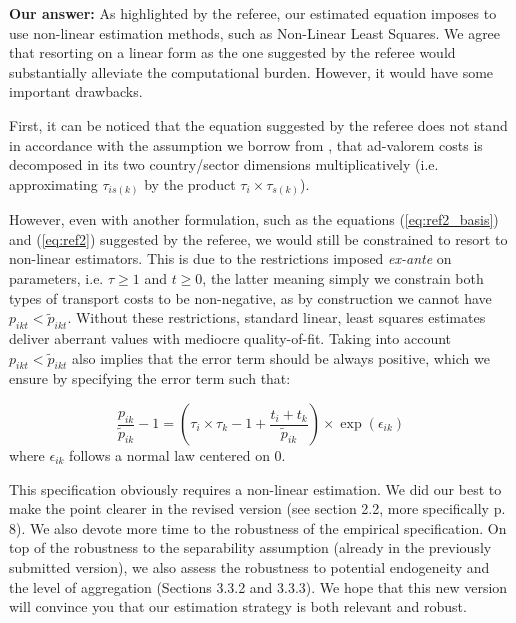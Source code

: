 \documentclass[a4paper,11pt]{article}
\begin{document}
\textbf{Our answer:} As highlighted by the referee, our estimated equation imposes to use non-linear estimation methods, such as Non-Linear Least Squares. We agree that resorting on a linear form as the one suggested by the referee would substantially alleviate the computational burden. However, it would have some important drawbacks.

First, it can be noticed that the equation suggested by the referee does not stand in accordance with the assumption we borrow from \cite{Irrazabal_2015}, that ad-valorem costs is decomposed in its two country/sector dimensions multiplicatively (i.e. approximating $\tau_{is(k)}$ by the product $\tau_i\times \tau_{s(k)}$).

However, even with another formulation, such as the equations (\ref{eq:ref2_basis}) and (\ref{eq:ref2}) suggested by the referee, we would still be constrained to resort to non-linear estimators. This is due to the restrictions imposed \textit{ex-ante} on parameters, i.e. $\tau \geq 1$ and $t\geq 0$, the latter meaning simply we constrain both types of transport costs to be non-negative, as by construction we cannot have $p_{ikt} < \widetilde{p}_{ikt}$. Without these restrictions, standard linear, least squares estimates deliver aberrant values with mediocre quality-of-fit. Taking into account $p_{ikt} < \widetilde{p}_{ikt}$ also implies that the error term should be always positive, which we ensure by specifying the error term such that:

\begin{equation*}
\frac{p_{ik}}{\widetilde{p}_{ik}}-1 =\left(\tau_{i}\times \tau_{k} -1+\frac{t_{i} + t_{k}}{\widetilde{p}_{ik}} \right)\times \exp(\epsilon_{ik})
\end{equation*}
\noindent where $\epsilon_{ik}$ follows a normal law centered on 0.

This specification obviously requires a non-linear estimation. We did our best to make the point clearer in the revised version (see section 2.2, more specifically p. 8). We also devote more time to the robustness of the empirical specification. On top of the robustness to the separability assumption (already in the previously submitted version), we also assess the robustness to potential endogeneity and the level of aggregation (Sections 3.3.2 and 3.3.3). We hope that this new version will convince you that our estimation strategy is both relevant and robust.



\newpage


\end{document}
